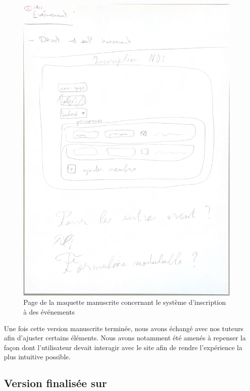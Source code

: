 \begin{figure}[H]
    \centering
    \includegraphics[scale=0.5]{assets/pictures/maquette-inscription.pdf}
    \captionsetup{justification=centering}
    \caption{Page de la maquette manuscrite concernant le système d'inscription à des événements}
    \label{fig:maquette-inscription}
\end{figure}


Une fois cette version manuscrite terminée, nous avons échangé avec nos tuteurs afin d’ajuster certains éléments.
Nous avons notamment été amenés à repenser la façon dont l'utilisateur devait interagir avec le site afin de rendre l'expérience la plus intuitive possible.

\subsection{Version finalisée sur }
\label{subsec:maquette-figma}

